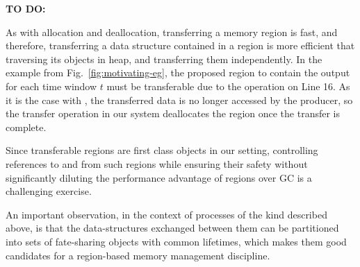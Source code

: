 

\textbf{TO DO:}

As with allocation and deallocation, transferring a memory region is fast, and therefore,
transferring a data structure contained in a region is more efficient
that traversing its objects in heap, and transferring them
independently.
In the  example from
Fig.~\ref{fig:motivating-eg}, the proposed region to contain the
output for each time window $t$ must be transferable due to the
 operation on Line 16. As it is the case with
, the transferred data is no longer accessed by the
producer, so the transfer operation in our system deallocates the
region once the transfer is complete.

Since transferable regions are first class objects in our setting,
controlling references to and from such regions while ensuring their
safety without significantly diluting the performance advantage of
regions over GC is a challenging exercise.

An important observation, in the context of processes of the kind
described above, is that the data-structures exchanged between them
can be partitioned into sets of fate-sharing objects with common
lifetimes, which makes them good candidates for a region-based memory
management discipline.